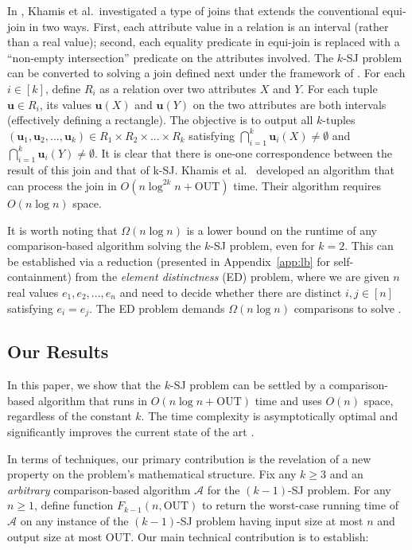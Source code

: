 \documentclass[sigconf]{acmart}
\def\vgap{\vspace{0mm}}
\def\A{\mathcal{A}}
\def\out{\mathrm{OUT}}
\begin{document}
\vgap

In \cite{kcko22}, Khamis et al.\ investigated a type of joins that extends the conventional equi-join in two ways. First, each attribute value in a relation is an interval (rather than a real value); second, each equality predicate in equi-join is replaced with a ``non-empty intersection'' predicate on the attributes involved. The $k$-SJ problem can be converted to solving a join defined next under the framework of \cite{kcko22}. For each $i \in [k]$, define $R_i$ as a relation over two attributes $X$ and $Y$. For each tuple $\bm{u} \in R_i$, its values $\bm{u}(X)$ and $\bm{u}(Y)$ on the two attributes are both intervals (effectively defining a rectangle). The objective is to output all $k$-tuples $(\bm{u}_1, \bm{u}_2, ..., \bm{u}_k) \in R_1 \times R_2 \times ... \times R_k$ satisfying $\bigcap_{i=1}^k \bm{u}_i(X) \ne \emptyset$ and $\bigcap_{i=1}^k \bm{u}_i(Y) \ne \emptyset$. It is clear that there is one-one correspondence between the result of this join and that of k-SJ. Khamis et al.\ \cite{kcko22} developed an algorithm that can process the join  in $O(n \log^{2k} n + \out)$ time. Their algorithm requires $O(n \log n)$ space.

\vgap 

It is worth noting that $\Omega(n \log n)$ is a lower bound on the runtime of any comparison-based algorithm solving the $k$-SJ problem, even for $k = 2$. This can be established via a reduction (presented in Appendix~\ref{app:lb} for self-containment) from the {\em element distinctness} (ED) problem, where we are given $n$ real values $e_1, e_2, ..., e_n$ and need to decide whether there are distinct $i, j \in [n]$ satisfying $e_i = e_j$. The ED problem demands $\Omega(n \log n)$ comparisons to solve \cite{dl79}.


\subsection{Our Results} \label{sec:intro:ours} 

In this paper, we show that the $k$-SJ problem can be settled by a comparison-based algorithm that runs in $O(n \log n + \out)$ time and uses  $O(n)$ space, regardless of the constant $k$. The time complexity is asymptotically optimal and significantly improves the current state of the art \cite{kcko22}.

\vgap 

In terms of techniques, our primary contribution is the revelation of a new property on the problem's mathematical structure. Fix any $k \ge 3$ and an {\em arbitrary} comparison-based algorithm $\A$ for the $(k-1)$-SJ problem. For any $n \ge 1$, define function $F_{k-1}(n, \out)$ to return the worst-case running time of $\A$ on any instance of the $(k-1)$-SJ problem having input size at most $n$ and output size at most $\out$. Our main technical contribution is to establish:
\end{document}
